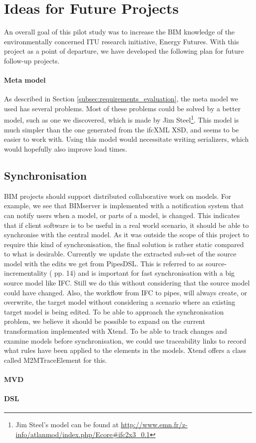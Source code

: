 \section{Ideas for Future Projects}
\label{sec:plan_for_future_projects}
An overall goal of this pilot study was to increase the BIM knowledge of the environmentally concerned ITU research initiative, Energy Futures. With this project as a point of departure, we have developed the following plan for future follow-up projects.

\paragraph{Meta model}
As described in Section \ref{subsec:requirements_evaluation}, the meta model we used has several problems. Most of these problems could be solved by a better model, such as one we discovered, which is made by Jim Steel\footnote{Jim Steel's model can be found at \url{http://www.emn.fr/z-info/atlanmod/index.php/Ecore#ifc2x3_0.1}}. This model is much simpler than the one generated from the ifcXML XSD, and seems to be easier to work with. Using this model would necessitate writing serializers, which would hopefully also improve load times.

\subsection{Synchronisation}
    BIM projects should support distributed collaborative work on models. For example, we see that BIMserver is implemented with a notification system that can notify users when a model, or parts of a model, is changed. This indicates that if client software is to be useful in a real world scenario, it should be able to synchronise with the central model. As it was outside the scope of this project to require this kind of synchronisation, the final solution is rather static compared to what is desirable. Currently we update the extracted sub-set of the source model with the edits we get from PipesDSL. This is referred to as source-incrementality (\cite{czarnecki06} pp. 14) and is important for fast synchronisation with a big source model like IFC. Still we do this without considering that the source model could have changed. Also, the workflow from IFC to pipes, will always create, or overwrite, the target model without considering a scenario where an existing target model is being edited. To be able to approach the synchronisation problem, we believe it should be possible to expand on the current transformation implemented with Xtend. To be able to track changes and examine models before synchronisation, we could use traceability links to record what rules have been applied to the elements in the models. Xtend offers a class called M2MTraceElement\cite{xtendtrace} for this.



\paragraph{MVD}

\paragraph{DSL}

